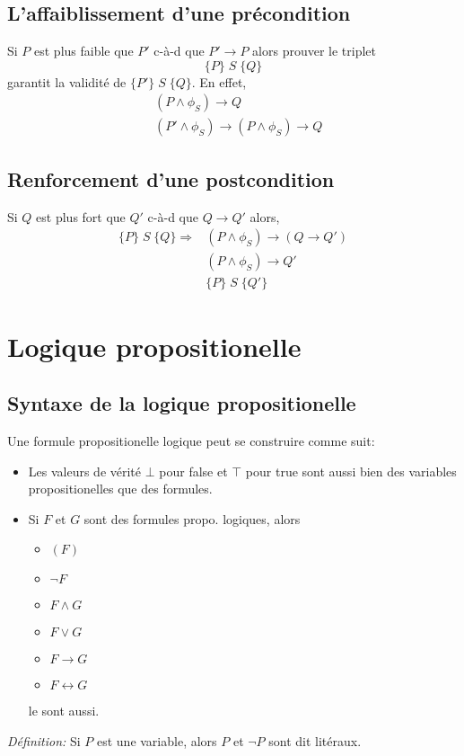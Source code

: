 \documentclass[12pt]{article}
\begin{document}
\subsection*{L'affaiblissement d'une précondition}
Si $P$ est plus faible que $P'$ c-à-d que $P' \to P$ alors prouver le triplet
\[\{P\}\;S\;\{Q\}\]
garantit la validité de $\{P'\} \; S \; \{Q\}$. En effet, 
\begin{align*}
    &(P \wedge \phi_{S}) \to Q\\
    &(P' \wedge \phi_{S}) \to (P \wedge \phi_{S}) \to Q
\end{align*}

\subsection*{Renforcement d'une postcondition}

Si $Q$ est plus fort que $Q'$ c-à-d que $Q \to Q'$ alors,
\begin{align*}
    \{P\}\;S\;\{Q\} \Rightarrow &(P \wedge \phi_{S}) \to (Q \to Q')\\
    &(P \wedge \phi_{S}) \to Q'\\
    &\{P\}\;S\;\{Q'\}
\end{align*}

\section*{Logique propositionelle}
\subsection*{Syntaxe de la logique propositionelle}
Une formule propositionelle logique peut se construire comme suit:
\begin{itemize}
    \item Les valeurs de vérité $\bot$ pour false et $\top$ pour true sont aussi bien des variables propositionelles que des formules.
    \item Si $F$ et $G$ sont des formules propo. logiques, alors
    \begin{itemize}
        \item $(F)$
        \item $\neg F$
        \item $F \wedge G$
        \item $F \vee G$
        \item $F \to G$
        \item $F \leftrightarrow G$
    \end{itemize}
    le sont aussi.
\end{itemize}
\emph{Définition: }Si $P$ est une variable, alors $P$ et $\neg P$ sont
dit litéraux.
\end{document}
